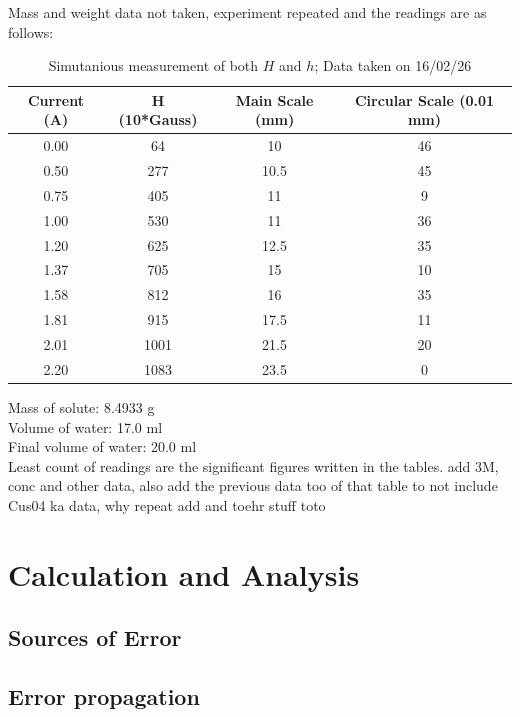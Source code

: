 \documentclass[%
 sor,
 jor,
 amsmath,amssymb,
 reprint,
]{revtex4-2}
\begin{document}
Mass and weight data not taken, experiment repeated and the readings are as follows:
\begin{center}
	\begin{table}[H]
		\centering
\begin{tabular}{|c|c|c|c|}
\hline
Current (A)&	H (10*Gauss)&	Main Scale (mm)&	Circular Scale (0.01 mm)\\
\hline
0.00    & 64   & 10   & 46  \\ 
0.50  & 277  & 10.5 & 45  \\ 
0.75 & 405  & 11   & 9   \\ 
1.00    & 530  & 11   & 36  \\ 
1.20  & 625  & 12.5 & 35  \\ 
1.37 & 705  & 15   & 10  \\ 
1.58 & 812  & 16   & 35  \\ 
1.81 & 915  & 17.5 & 11  \\ 
2.01 & 1001 & 21.5 & 20  \\
2.20  & 1083 & 23.5 & 0   \\ 
\hline
\end{tabular}
\caption{Simutanious measurement of both $H$ and  $h$; Data taken on 16/02/26}
\end{table}
\end{center}

Mass of solute: 8.4933 g \\
Volume of water: 17.0 ml\\
Final volume of water: 20.0 ml\\


Least count of readings are the significant figures written in the tables.
add 3M, conc and other data, also add the previous data too of that table to not include Cus04 ka data, why repeat add and toehr stuff toto


\section{Calculation and Analysis}
\subsection{Sources of Error}



\subsection{Error propagation}
\end{document}
